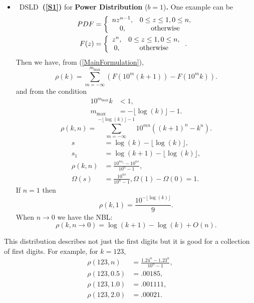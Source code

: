 \documentclass[titlepage,fleqn]{article}%
\begin{document}
\begin{itemize}
\item \ DSLD\textbf{\ (\ref{S1})} for \textbf{Power Distribution}
($b=1$)\textbf{. }One example can be
\begin{align*}
PDF  &  =\left\{
\begin{array}
[c]{cc}%
nz^{n-1}, & 0\leq z\leq1,0\leq n,\\
0, & \text{otherwise}%
\end{array}
\right. \\
F(z)  &  =\left\{
\begin{array}
[c]{cc}%
z^{n}, & 0\leq z\leq1,0\leq n,\\
0, & \text{otherwise}%
\end{array}
\right.  .
\end{align*}
Then we have, from (\ref{MainFormulation}),%
\[
\rho(k)=%
{\displaystyle\sum\limits_{m=-\infty}^{m_{\max}}}
\left(  F(10^{m}(k+1))-F(10^{m}k)\right)  .
\]
and from the condition%
\begin{align*}
10^{m_{\max}}k  &  <1,\\
m_{\max}  &  =-\lfloor\log(k)\rfloor-1.
\end{align*}%
\[
\rho(k,n)=%
{\displaystyle\sum\limits_{m=-\infty}^{-\lfloor\log(k)\rfloor-1}}
10^{mn}\left(  (k+1)^{n}-k^{n}\right)  .
\]%
\begin{align}
s  &  =\log(k)-\lfloor\log(k)\rfloor,\label{Model1}\\
s_{1}  &  =\log(k+1)-\lfloor\log(k)\rfloor,\nonumber\\
\rho(k,n)  &  =\frac{10^{ns_{1}}-10^{ns}}{10^{n}-1},\nonumber\\
\Omega(s)  &  =\frac{10^{ns}}{10^{n}-1},\Omega(1)-\Omega(0)=1.\nonumber
\end{align}
If $n=1$ then
\[
\rho(k,1)=\frac{10^{-\lfloor\log(k)\rfloor}}{9}.
\]
When $n\rightarrow0$ we have the NBL:%
\[
\rho(k,n\rightarrow0)=\log(k+1)-\log(k)+O(n).
\]

\end{itemize}

This distribution describes not just the first digits but it is good for a
collection of first digits. For example, for $k=123$,%
\begin{align*}
\rho(123,n)  &  =\frac{1.24^{n}-1.23^{n}}{10^{n}-1},\\
\rho(123,0.5)  &  =.00185,\\
\rho(123,1.0)  &  =.001111,\\
\rho(123,2.0)  &  =.00021.
\end{align*}
\end{document}
